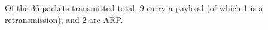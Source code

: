 Of the 36 packets transmitted total, 9 carry a payload (of which 1 is a retransmission), and 2 are ARP.